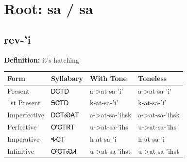 \documentclass{article}%
\begin{document}
%
\normalsize%
\section*{Root: sa / sa}%
\subsection*{rev-'i}%
\textbf{Definition: }%
it’s hatching%
\\[0.5em]%
\begin{tabular}{|l|l|l|l|}%
\hline%
\textbf{Form}&\textbf{Syllabary}&\textbf{With Tone}&\textbf{Toneless}\\%
\hline%
Present&ᎠᏣᎢᎠ&a{-}>at{-}sa{-}'i'&a{-}>at{-}sa{-}'i'\\%
1st Present&ᎦᏣᎢᎠ&k{-}at{-}sa{-}'i'&k{-}at{-}sa{-}'i'\\%
Imperfective&ᎠᏣᎢᏍᎪᎢ&a{-}>at{-}sa{-}'ihsk&a{-}>at{-}sa{-}'ihsk\\%
Perfective&ᎤᏣᎢᏒᎢ&u{-}>at{-}sa{-}'ihs&u{-}>at{-}sa{-}'ihs\\%
Imperative&ᎭᏣᎢ&h{-}at{-}sa{-}'i&h{-}at{-}sa{-}'i\\%
Infinitive&ᎤᏣᎢᏍᏗ&u{-}>at{-}sa{-}'ihst&u{-}>at{-}sa{-}'ihst\\%
\hline%
\end{tabular}%
\\[1em]%
\end{document}
